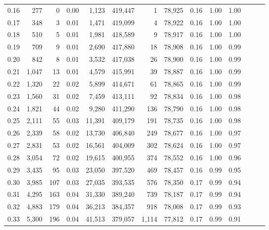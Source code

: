 \begin{tabular}{rrrrrrrrrrrrrr}
0.16 &     277 &      0 &  0.00 &    1,123 &  419,447 &       1 &  78,925 &  0.16 &  1.00 &      1.00 \\
0.17 &     348 &      3 &  0.01 &    1,471 &  419,099 &       4 &  78,922 &  0.16 &  1.00 &      1.00 \\
0.18 &     510 &      5 &  0.01 &    1,981 &  418,589 &       9 &  78,917 &  0.16 &  1.00 &      1.00 \\
0.19 &     709 &      9 &  0.01 &    2,690 &  417,880 &      18 &  78,908 &  0.16 &  1.00 &      0.99 \\
0.20 &     842 &      8 &  0.01 &    3,532 &  417,038 &      26 &  78,900 &  0.16 &  1.00 &      0.99 \\
0.21 &   1,047 &     13 &  0.01 &    4,579 &  415,991 &      39 &  78,887 &  0.16 &  1.00 &      0.99 \\
0.22 &   1,320 &     22 &  0.02 &    5,899 &  414,671 &      61 &  78,865 &  0.16 &  1.00 &      0.99 \\
0.23 &   1,560 &     31 &  0.02 &    7,459 &  413,111 &      92 &  78,834 &  0.16 &  1.00 &      0.98 \\
0.24 &   1,821 &     44 &  0.02 &    9,280 &  411,290 &     136 &  78,790 &  0.16 &  1.00 &      0.98 \\
0.25 &   2,111 &     55 &  0.03 &   11,391 &  409,179 &     191 &  78,735 &  0.16 &  1.00 &      0.98 \\
0.26 &   2,339 &     58 &  0.02 &   13,730 &  406,840 &     249 &  78,677 &  0.16 &  1.00 &      0.97 \\
0.27 &   2,831 &     53 &  0.02 &   16,561 &  404,009 &     302 &  78,624 &  0.16 &  1.00 &      0.97 \\
0.28 &   3,054 &     72 &  0.02 &   19,615 &  400,955 &     374 &  78,552 &  0.16 &  1.00 &      0.96 \\
0.29 &   3,435 &     95 &  0.03 &   23,050 &  397,520 &     469 &  78,457 &  0.16 &  0.99 &      0.95 \\
0.30 &   3,985 &    107 &  0.03 &   27,035 &  393,535 &     576 &  78,350 &  0.17 &  0.99 &      0.94 \\
0.31 &   4,295 &    163 &  0.04 &   31,330 &  389,240 &     739 &  78,187 &  0.17 &  0.99 &      0.94 \\
0.32 &   4,883 &    179 &  0.04 &   36,213 &  384,357 &     918 &  78,008 &  0.17 &  0.99 &      0.93 \\
0.33 &   5,300 &    196 &  0.04 &   41,513 &  379,057 &   1,114 &  77,812 &  0.17 &  0.99 &      0.91 \\

\end{tabular}
